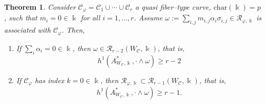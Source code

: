 \documentclass[11pt]{amsart}
\def\cC{\mathcal{C}}
\def\cR{{\mathcal R}}
\def\kk{\Bbbk}
\def\w{\omega}
\theoremstyle{plain}
\newtheorem{thm}{Theorem}
\theoremstyle{definition}
\begin{document}
\begin{thm}
\label{thm:fibered}
Consider $\cC_\varphi=\cC_1\cup\cdots\cup\cC_r$ a quasi fiber--type curve, $\mathrm{char}(\kk)=p$, 
such that $m_i=0\in\kk$ for all $i=1,...,r$. Assume $\omega:=\sum_{i,j} m_{i,j}\alpha_{i}\sigma_{i,j}\in\cR_{\varphi,\kk}$ is associated with $\cC_\varphi$. Then, 
\begin{enumerate}
    \item\label{thm:fibered:1} If $\sum_i \alpha_i=0\in\kk$,
then $\omega\in \cR_{r-2}(W_\cC,\kk)$, that is,
\begin{equation}
\label{eq:fibered:general}
h^1(A^*_{W_{\cC},\kk},\cdot\wedge\w)\geq r-2 
\end{equation}
    \item\label{thm:fibered:2} If $\cC_\varphi$ has index $k=0\in\kk$,
then $\cR_{\varphi,\kk}\subset \cR_{r-1}(W_\cC,\kk)$, that is,
\begin{equation}
\label{eq:fibered:indexp}
h^1(A^*_{W_{\cC},\kk},\cdot\wedge\w)\geq r-1.
\end{equation}
\end{enumerate}
\end{thm}
\end{document}
